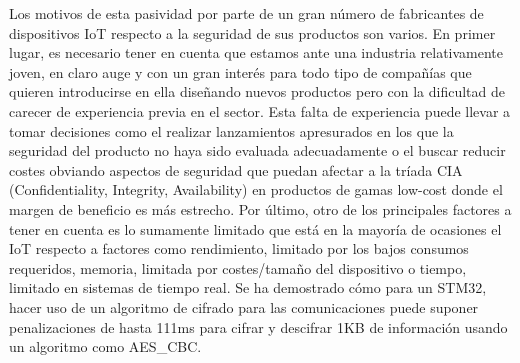 Los motivos de esta pasividad por parte de un gran número de fabricantes de dispositivos IoT respecto a la 
seguridad de sus productos son varios. En primer lugar, es necesario tener en cuenta que estamos ante una industria relativamente 
joven, en claro auge y con un gran interés para todo tipo de compañías que quieren introducirse en ella diseñando 
nuevos productos pero con la dificultad de carecer de experiencia previa en el sector. Esta falta de experiencia puede
llevar a tomar decisiones como el realizar lanzamientos apresurados en los que la seguridad del producto no haya 
sido evaluada adecuadamente o el buscar reducir costes obviando aspectos de seguridad que puedan afectar a 
la tríada CIA (Confidentiality, Integrity, Availability) en productos de gamas low-cost donde el margen de beneficio 
es más estrecho. Por último, otro de los principales factores a tener en cuenta es lo sumamente limitado que 
está en la mayoría de ocasiones el IoT respecto a factores como rendimiento, limitado por los bajos consumos 
requeridos, memoria, limitada por costes/tamaño del dispositivo o tiempo, limitado en sistemas de tiempo real. 
Se ha demostrado cómo para un STM32, hacer uso de un algoritmo de cifrado para las comunicaciones puede suponer 
penalizaciones de hasta 111ms\cite{performance} para cifrar y descifrar 1KB de información usando un algoritmo como AES\_CBC.\bigskip

